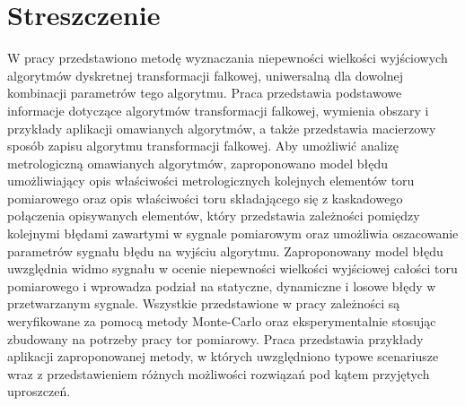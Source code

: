 \chapter*{Streszczenie}

W pracy przedstawiono metodę wyznaczania niepewności wielkości wyjściowych algorytmów dyskretnej transformacji falkowej, uniwersalną dla dowolnej kombinacji parametrów tego algorytmu. Praca przedstawia podstawowe informacje dotyczące algorytmów transformacji falkowej, wymienia obszary i przykłady aplikacji omawianych algorytmów, a także przedstawia macierzowy sposób zapisu algorytmu transformacji falkowej. Aby umożliwić analizę metrologiczną omawianych algorytmów, zaproponowano model błędu umożliwiający opis właściwości metrologicznych kolejnych elementów toru pomiarowego oraz opis właściwości toru składającego się z kaskadowego połączenia opisywanych elementów, który przedstawia zależności pomiędzy kolejnymi błędami zawartymi w sygnale pomiarowym oraz umożliwia oszacowanie parametrów sygnału błędu na wyjściu algorytmu. Zaproponowany model błędu uwzględnia widmo sygnału w ocenie niepewności wielkości wyjściowej całości toru pomiarowego i wprowadza podział na statyczne, dynamiczne i losowe błędy w przetwarzanym sygnale. Wszystkie przedstawione w pracy zależności są weryfikowane za pomocą metody Monte-Carlo oraz eksperymentalnie stosując zbudowany na potrzeby pracy tor pomiarowy. Praca przedstawia przykłady aplikacji zaproponowanej metody, w których uwzględniono typowe scenariusze wraz z przedstawieniem różnych możliwości rozwiązań pod kątem przyjętych uproszczeń.
